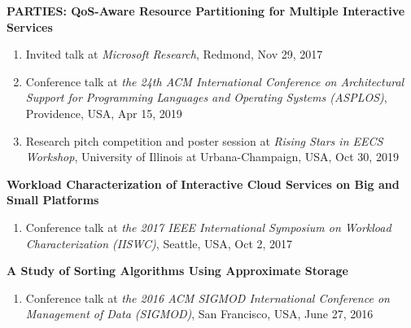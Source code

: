 \documentclass{res}
\begin{document}
\begin{resume}
{\bf PARTIES: QoS-Aware Resource Partitioning for Multiple Interactive Services}
\renewcommand{\labelenumi}{--}
\begin{enumerate}
\item Invited talk at {\em Microsoft Research}, Redmond, Nov 29, 2017
\item Conference talk at {\em the 24th ACM International Conference on Architectural Support for Programming Languages and Operating Systems (ASPLOS)}, Providence, USA, Apr 15, 2019
\item Research pitch competition and poster session at {\em Rising Stars in EECS Workshop}, University of Illinois at Urbana-Champaign, USA, Oct 30, 2019
\end{enumerate}

{\bf Workload Characterization of Interactive Cloud Services on Big and Small Platforms}
\renewcommand{\labelenumi}{--}
\begin{enumerate}
\item Conference talk at {\em the 2017 IEEE International Symposium on Workload Characterization (IISWC)}, Seattle, USA, Oct 2, 2017
\end{enumerate}

{\bf A Study of Sorting Algorithms Using Approximate Storage}
\renewcommand{\labelenumi}{--}
\begin{enumerate}
\item Conference talk at {\em the 2016 ACM SIGMOD International Conference on Management of Data (SIGMOD)}, San Francisco, USA, June 27, 2016
\end{enumerate}


\vspace{0.05in}

\end{resume}
\end{document}
